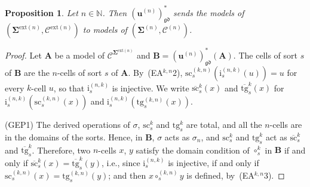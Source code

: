\documentclass{amsart}
\theoremstyle{plain}
\newtheorem{proposition}[theorem]{Proposition}
\theoremstyle{definition}
\begin{document}
\begin{proposition}\label{PUnifDerivor}
Let $n\in\mathbb{N}$. Then $(\mathbf{u}^{(n)})^{\ast}_{\mathfrak{gd}}$ sends the models of $(\mathbf{\Sigma}^{\mathrm{ext}(n)},\mathcal{C}^{\mathrm{ext}(n)})$ to models of $(\mathbf{\Sigma}^{(n)},\mathcal{C}^{(n)})$.
\end{proposition}
\begin{proof}
Let $\mathbf{A}$ be a model of $\boldsymbol{\mathcal{C}}^{\mathbf{\Sigma}^{\mathrm{ext}(n)}}$ and $\mathbf{B}=(\mathbf{u}^{(n)})^{\ast}_{\mathfrak{gd}}(\mathbf{A})$. The cells of sort $s$ of $\mathbf{B}$ are the $n$-cells of sort $s$ of $\mathbf{A}$. By~(EA$^{k,n}$2), $\mathrm{sc}^{(k,n)}_{s}(\mathrm{i}^{(n,k)}_{s}(u))=u$ for every $k$-cell $u$, so that $\mathrm{i}^{(n,k)}_{s}$ is injective. We write $\overline{\mathrm{sc}}^{k}_{s}(x)$ and $\overline{\mathrm{tg}}^{k}_{s}(x)$ for $\mathrm{i}^{(n,k)}_{s}(\mathrm{sc}^{(k,n)}_{s}(x))$ and $\mathrm{i}^{(n,k)}_{s}(\mathrm{tg}^{(k,n)}_{s}(x))$.

(GEP1) The derived operations of $\sigma$, $\mathrm{sc}^{k}_{s}$ and $\mathrm{tg}^{k}_{s}$ are total, and all the $n$-cells are in the domains of the sorts. Hence, in $\mathbf{B}$, $\sigma$ acts as $\sigma_{n}$, and $\mathrm{sc}^{k}_{s}$ and $\mathrm{tg}^{k}_{s}$ act as $\overline{\mathrm{sc}}^{k}_{s}$ and $\overline{\mathrm{tg}}^{k}_{s}$. Therefore, two $n$-cells $x$, $y$ satisfy the domain condition of $\circ^{k}_{s}$ in $\mathbf{B}$ if and only if $\overline{\mathrm{sc}}^{k}_{s}(x)=\overline{\mathrm{tg}}^{k}_{s}(y)$, i.e., since $\mathrm{i}^{(n,k)}_{s}$ is injective, if and only if $\mathrm{sc}^{(k,n)}_{s}(x)=\mathrm{tg}^{(k,n)}_{s}(y)$; and then $x\circ^{(k,n)}_{s}y$ is defined, by~(EA$^{k,n}$3).


\end{proof}
\end{document}
